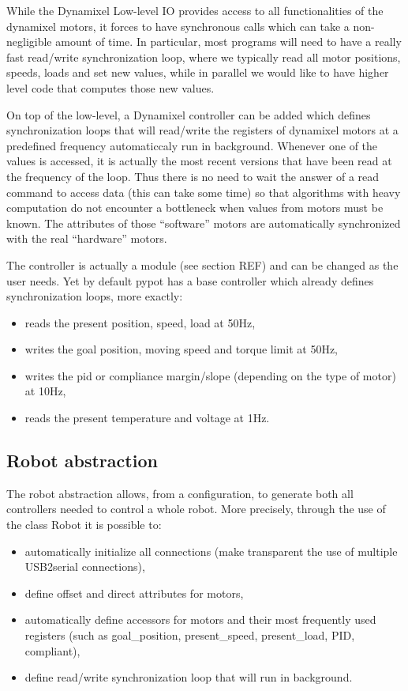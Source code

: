 While the Dynamixel Low-level IO provides access to all functionalities of the dynamixel motors, it forces to have synchronous calls which can take a non-negligible amount of time. In particular, most programs will need to have a really fast read/write synchronization loop, where we typically read all motor positions, speeds, loads and set new values, while in parallel we would like to have higher level code that computes those new values.

On top of the low-level, a Dynamixel controller can be added which defines synchronization loops that will read/write the registers of dynamixel motors at a predefined frequency automaticcaly run in background.
Whenever one of the values is accessed, it is actually the most recent versions that have been read at the frequency of the loop. Thus there is no need to wait the answer of a read command to access data (this can take some time) so that algorithms with heavy computation do not encounter a bottleneck when values from motors must be known. The attributes of those “software” motors are automatically synchronized with the real “hardware” motors.

The controller is actually a module (see section REF) and can be changed as the user needs. Yet by default pypot has a base controller which already defines synchronization loops, more exactly:

\begin{itemize}
    \item reads the present position, speed, load at 50Hz,
    \item writes the goal position, moving speed and torque limit at 50Hz,
    \item writes the pid or compliance margin/slope (depending on the type of motor) at 10Hz,
    \item reads the present temperature and voltage at 1Hz.
\end{itemize}



\subsection{Robot abstraction} %

The robot abstraction allows, from a configuration, to generate both all controllers needed to control a whole robot. More precisely, through the use of the class Robot it is possible to:

\begin{itemize}
    \item automatically initialize all connections (make transparent the use of multiple USB2serial connections),
    \item define offset and direct attributes for motors,
    \item automatically define accessors for motors and their most frequently used registers (such as goal\_position, present\_speed, present\_load, PID, compliant),
    \item define read/write synchronization loop that will run in background.
\end{itemize}

